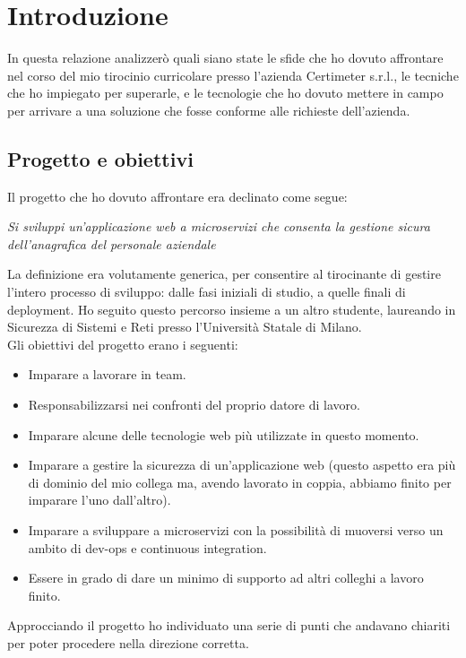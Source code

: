 \chapter{Introduzione}
In questa relazione analizzerò quali siano state le sfide che ho dovuto affrontare nel corso del mio tirocinio curricolare presso l'azienda Certimeter s.r.l., le tecniche che ho impiegato per superarle, e le tecnologie che ho dovuto mettere in campo per arrivare a una soluzione che fosse conforme alle richieste dell'azienda.

\section{Progetto e obiettivi}
Il progetto che ho dovuto affrontare era declinato come segue:
\begin{displayquote}
\emph{Si sviluppi un'applicazione web a microservizi che consenta la gestione sicura dell'anagrafica del personale aziendale}
\end{displayquote}
La definizione era volutamente generica, per consentire al tirocinante di gestire l'intero processo di sviluppo: dalle fasi iniziali di studio, a quelle finali di deployment. Ho seguito questo percorso insieme a un altro studente, laureando in Sicurezza di Sistemi e Reti presso l'Università Statale di Milano.
\\
Gli obiettivi del progetto erano i seguenti:
\begin{itemize}
    \item Imparare a lavorare in team.
    \item Responsabilizzarsi nei confronti del proprio datore di lavoro.
    \item Imparare alcune delle tecnologie web più utilizzate in questo momento.
    \item Imparare a gestire la sicurezza di un'applicazione web (questo aspetto era più di dominio del mio collega ma, avendo lavorato in coppia, abbiamo finito per imparare l'uno dall'altro).
    \item Imparare a sviluppare a microservizi con la possibilità di muoversi verso un ambito di dev-ops e continuous integration.
    \item Essere in grado di dare un minimo di supporto ad altri colleghi a lavoro finito.
\end{itemize}
Approcciando il progetto ho individuato una serie di punti che andavano chiariti per poter procedere nella direzione corretta.
